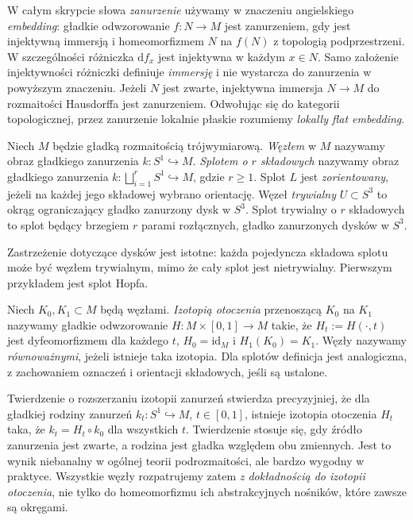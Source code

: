 \begin{uwaga}
W całym skrypcie słowa \emph{zanurzenie} używamy w znaczeniu
angielskiego \emph{embedding}: gładkie odwzorowanie
$f\colon N\to M$ jest zanurzeniem, gdy jest injektywną immersją
i homeomorfizmem $N$ na $f(N)$ z topologią podprzestrzeni.
W szczególności różniczka $\mathrm df_x$ jest injektywna w każdym
$x\in N$. Samo założenie injektywności różniczki definiuje
\emph{immersję} i nie wystarcza do zanurzenia w powyższym
znaczeniu. Jeżeli $N$ jest zwarte, injektywna immersja
$N\to M$ do rozmaitości Hausdorffa jest zanurzeniem.
Odwołując się do kategorii topologicznej, przez zanurzenie
lokalnie płaskie rozumiemy \emph{lokally flat embedding}.
\end{uwaga}


\begin{definicja}
Niech $M$ będzie gładką rozmaitością trójwymiarową.
\emph{Węzłem} w $M$ nazywamy obraz gładkiego zanurzenia
$k\colon S^1\hookrightarrow M$.
\emph{Splotem o $r$ składowych} nazywamy obraz gładkiego zanurzenia
$k\colon\bigsqcup_{i=1}^{r}S^1\hookrightarrow M$, gdzie $r\geq1$.
Splot $L$ jest \emph{zorientowany}, jeżeli na każdej jego składowej
wybrano orientację. Węzeł \emph{trywialny} $U\subset S^3$ to okrąg
ograniczający gładko zanurzony dysk w $S^3$. Splot trywialny o $r$
składowych to splot będący brzegiem $r$ parami rozłącznych,
gładko zanurzonych dysków w $S^3$.
\end{definicja}

Zastrzeżenie dotyczące dysków jest istotne: każda pojedyncza składowa
splotu może być węzłem trywialnym, mimo że cały splot jest
nietrywialny. Pierwszym przykładem jest splot Hopfa.

\begin{definicja}
Niech $K_0,K_1\subset M$ będą węzłami. \emph{Izotopią otoczenia}
przenoszącą $K_0$ na $K_1$ nazywamy gładkie odwzorowanie
$H\colon M\times[0,1]\to M$ takie, że $H_t:=H(\cdot,t)$
jest dyfeomorfizmem dla każdego $t$, $H_0=\mathrm{id}_M$ i
$H_1(K_0)=K_1$. Węzły nazywamy \emph{równoważnymi}, jeżeli
istnieje taka izotopia. Dla splotów definicja jest analogiczna,
z zachowaniem oznaczeń i orientacji składowych, jeśli są ustalone.
\end{definicja}

Twierdzenie o rozszerzaniu izotopii zanurzeń stwierdza precyzyjniej,
że dla gładkiej rodziny zanurzeń $k_t\colon S^1\hookrightarrow M$,
$t\in[0,1]$, istnieje izotopia otoczenia $H_t$ taka, że
$k_t=H_t\circ k_0$ dla wszystkich $t$. Twierdzenie stosuje się,
gdy źródło zanurzenia jest zwarte, a rodzina jest gładka względem
obu zmiennych. Jest to wynik niebanalny w ogólnej teorii podrozmaitości,
ale bardzo wygodny w praktyce. Wszystkie węzły rozpatrujemy zatem
\emph{z dokładnością do izotopii otoczenia}, nie tylko do homeomorfizmu
ich abstrakcyjnych nośników, które zawsze są okręgami.

